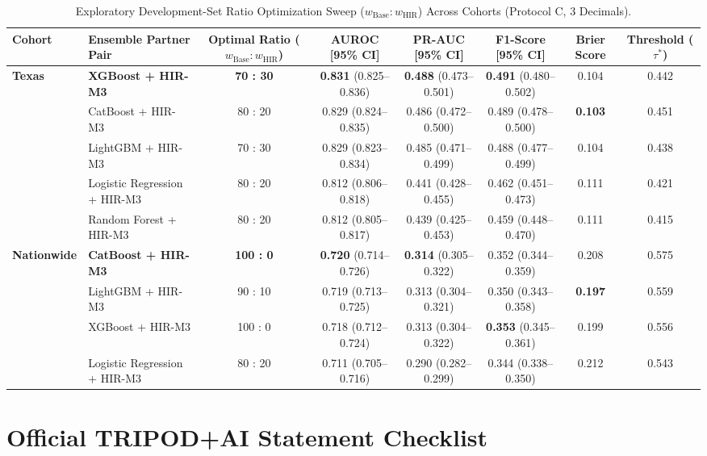 \documentclass[10pt,journal]{IEEEtran}
\begin{document}
\begin{table}[!t]
\caption{Exploratory Development-Set Ratio Optimization Sweep ($w_{\text{Base}} : w_{\text{HIR}}$) Across Cohorts (Protocol C, 3 Decimals).}
\label{tab:s_ensemble_sweep}
\centering
\footnotesize
\begin{tabular}{llcccccc}
\toprule
\textbf{Cohort} & \textbf{Ensemble Partner Pair} & \textbf{Optimal Ratio ($w_{\text{Base}} : w_{\text{HIR}}$)} & \textbf{AUROC [95\% CI]} & \textbf{PR-AUC [95\% CI]} & \textbf{F1-Score [95\% CI]} & \textbf{Brier Score} & \textbf{Threshold ($\tau^*$)} \\
\midrule
\textbf{Texas} & \textbf{XGBoost + HIR-M3} & \textbf{70 : 30} & \textbf{0.831} (0.825--0.836) & \textbf{0.488} (0.473--0.501) & \textbf{0.491} (0.480--0.502) & 0.104 & 0.442 \\
 & CatBoost + HIR-M3 & 80 : 20 & 0.829 (0.824--0.835) & 0.486 (0.472--0.500) & 0.489 (0.478--0.500) & \textbf{0.103} & 0.451 \\
 & LightGBM + HIR-M3 & 70 : 30 & 0.829 (0.823--0.834) & 0.485 (0.471--0.499) & 0.488 (0.477--0.499) & 0.104 & 0.438 \\
 & Logistic Regression + HIR-M3 & 80 : 20 & 0.812 (0.806--0.818) & 0.441 (0.428--0.455) & 0.462 (0.451--0.473) & 0.111 & 0.421 \\
 & Random Forest + HIR-M3 & 80 : 20 & 0.812 (0.805--0.817) & 0.439 (0.425--0.453) & 0.459 (0.448--0.470) & 0.111 & 0.415 \\
\midrule
\textbf{Nationwide} & \textbf{CatBoost + HIR-M3} & \textbf{100 : 0} & \textbf{0.720} (0.714--0.726) & \textbf{0.314} (0.305--0.322) & 0.352 (0.344--0.359) & 0.208 & 0.575 \\
 & LightGBM + HIR-M3 & 90 : 10 & 0.719 (0.713--0.725) & 0.313 (0.304--0.321) & 0.350 (0.343--0.358) & \textbf{0.197} & 0.559 \\
 & XGBoost + HIR-M3 & 100 : 0 & 0.718 (0.712--0.724) & 0.313 (0.304--0.322) & \textbf{0.353} (0.345--0.361) & 0.199 & 0.556 \\
 & Logistic Regression + HIR-M3 & 80 : 20 & 0.711 (0.705--0.716) & 0.290 (0.282--0.299) & 0.344 (0.338--0.350) & 0.212 & 0.543 \\
\bottomrule
\end{tabular}
\end{table}

\section{Official TRIPOD+AI Statement Checklist}
\end{document}
